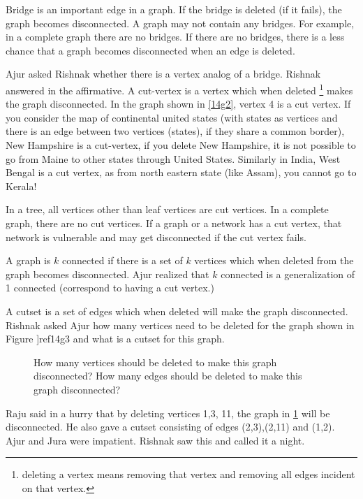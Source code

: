 Bridge is an important edge in a graph. If the bridge is deleted (if it fails), the graph becomes disconnected. A graph may not contain any bridges. For example, in a complete graph there are no
bridges. If there are no bridges, there is a less chance that a graph becomes disconnected when an edge is deleted.

Ajur asked Rishnak whether there is a vertex analog of a bridge. Rishnak answered in the affirmative. A cut-vertex is a vertex which when deleted \footnote{deleting a vertex means removing that vertex and removing all edges incident on that vertex.} makes the graph disconnected. In the graph shown in \ref{14g2}, vertex 4 is a cut vertex. If you consider the map of continental united states (with states as vertices and there is an edge between two vertices (states), if they share a common border), New Hampshire is a cut-vertex, if you delete New Hampshire, it is not possible to go from Maine to other states through United States. Similarly in India, West Bengal is  a cut vertex, as from north eastern state (like Assam), you cannot go to Kerala!

In a tree, all vertices other than leaf vertices are cut vertices. In a complete graph, there are no cut vertices. If a graph or a network has a cut vertex, that network is vulnerable and may get disconnected if the cut vertex fails. 

A graph is $k$ connected if there is a set of $k$ vertices which when deleted from the graph becomes disconnected. Ajur realized that $k$ connected is a generalization of 1 connected (correspond to having a cut vertex.)

A cutset is a set of edges which when deleted will make the graph disconnected. Rishnak asked Ajur how many vertices need to be deleted for the graph shown in Figure ]ref{14g3} and what is a cutset for this graph.

\begin{figure}
\begin{center}

\caption{How many vertices should be deleted to make this graph disconnected? How many edges should be deleted to make this graph disconnected? }\label{14g3}
\end{center}
\end{figure}

Raju said in a hurry that by deleting vertices 1,3, 11, the graph in \ref{14g3} will be disconnected. He
also gave a cutset consisting of edges (2,3),(2,11) and (1,2). Ajur and Jura were impatient. Rishnak saw this and called it a night.